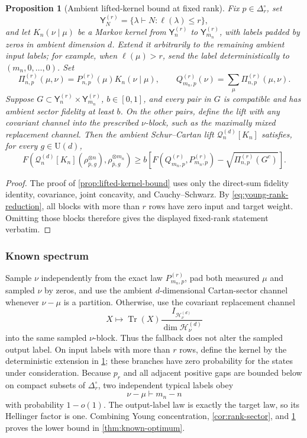 \documentclass[11pt]{article}
\newtheorem{proposition}[proposition]{Proposition}
\theoremstyle{remark}
\theoremstyle{plain}
\newcommand{\cH}{\mathcal H}
\newcommand{\U}{\mathrm U}
\newcommand{\Tr}{\operatorname{Tr}}
\newcommand{\ot}{\otimes}
\begin{document}
\begin{proposition}[Ambient lifted-kernel bound at fixed rank]
\label{prop:fixed-rank-lift}
Fix \(p\in\Delta_r^\circ\), set
\[
  \mathsf Y_N^{(r)}
  =\{\lambda\vdash N:\ell(\lambda)\le r\},
\]
and let \(K_n(\nu\mid\mu)\) be a Markov kernel from
\(\mathsf Y_n^{(r)}\) to \(\mathsf Y_{m_n}^{(r)}\), with labels padded by
zeros in ambient dimension \(d\).  Extend it arbitrarily to the remaining
ambient input labels; for example, when \(\ell(\mu)>r\), send the label
deterministically to \((m_n,0,\ldots,0)\).  Set
\[
  \Pi_{n,p}^{(r)}(\mu,\nu)
  =P_{n,p}^{(r)}(\mu)K_n(\nu\mid\mu),
  \qquad
  Q_{m_n,p}^{(r)}(\nu)=\sum_\mu\Pi_{n,p}^{(r)}(\mu,\nu).
\]
Suppose \(G\subset\mathsf Y_n^{(r)}\times\mathsf Y_{m_n}^{(r)}\),
\(b\in[0,1]\), and every pair in \(G\) is compatible and has ambient
sector fidelity at least \(b\).  On the other pairs, define the lift with
any covariant channel into the prescribed \(\nu\)-block, such as the
maximally mixed replacement channel.  Then the ambient Schur--Cartan lift
\(\mathcal Q_n^{(d)}[K_n]\) satisfies, for every \(g\in\U(d)\),
\[
  F\!\left(
    \mathcal Q_n^{(d)}[K_n](\rho_{\bar p,g}^{\ot n}),
    \rho_{\bar p,g}^{\ot m_n}
  \right)
  \ge b\left[
    F(Q_{m_n,p}^{(r)},P_{m_n,p}^{(r)})
    -\sqrt{\Pi_{n,p}^{(r)}(G^c)}
  \right].
\]
\end{proposition}

\begin{proof}
The proof of \cref{prop:lifted-kernel-bound} uses only
the direct-sum fidelity identity, covariance, joint concavity, and
Cauchy--Schwarz.  By \eqref{eq:young-rank-reduction}, all blocks with more
than \(r\) rows have zero input and target weight.  Omitting those blocks
therefore gives the displayed fixed-rank statement verbatim.
\end{proof}

\subsubsection{Known spectrum}

Sample \(\nu\) independently from the exact law
\(P_{m_n,p}^{(r)}\), pad both measured \(\mu\) and sampled \(\nu\) by zeros,
and use the ambient \(d\)-dimensional Cartan-sector channel whenever
\(\nu-\mu\) is a partition.  Otherwise, use the covariant replacement
channel
\[
  X\longmapsto \Tr(X)\frac{I_{\cH_\nu^{(d)}}}
                              {\dim\cH_\nu^{(d)}}
\]
into the same sampled \(\nu\)-block.  Thus the fallback does not alter the
sampled output label.  On input labels with more than \(r\) rows, define
the kernel by the deterministic extension in \cref{prop:fixed-rank-lift};
these branches have zero probability for the states under consideration.
Because \(p_r\) and all adjacent positive gaps are bounded below on compact
subsets of \(\Delta_r^\circ\), two independent typical labels obey
\[
  \nu-\mu\vdash m_n-n
\]
with probability \(1-o(1)\).  The output-label law is exactly the target
law, so its Hellinger factor is one.  Combining Young concentration,
\cref{cor:rank-sector}, and \cref{prop:fixed-rank-lift} proves the lower
bound in \cref{thm:known-optimum}.
\end{document}
